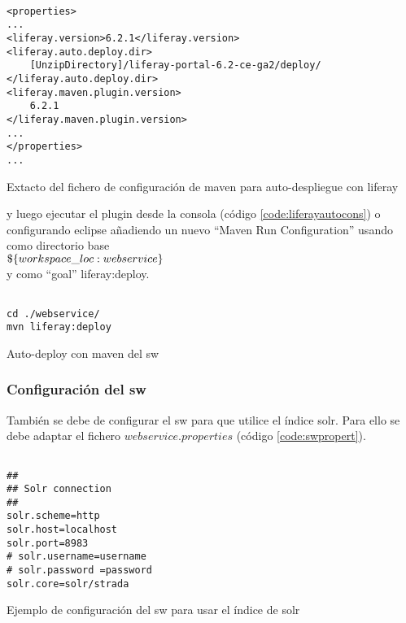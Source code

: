 \begin{listing}[H]
    \begin{verbatim}
               
<properties>
...
<liferay.version>6.2.1</liferay.version>
<liferay.auto.deploy.dir>
	[UnzipDirectory]/liferay-portal-6.2-ce-ga2/deploy/
</liferay.auto.deploy.dir>
<liferay.maven.plugin.version>
	6.2.1
</liferay.maven.plugin.version>
...
</properties>
...
    \end{verbatim}
    \caption{Extacto del fichero de configuración de \gls{maven} para auto-\gls{despliegue} con \gls{liferay}}
    \label{code:pomsw}
\end{listing}


y luego ejecutar el \gls{plugin} desde la consola (código \ref{code:liferayautocons}) o configurando \gls{eclipse} añadiendo un nuevo ``Maven Run Configuration'' usando como directorio base\\
$\$\{workspace\_loc:\/webservice\}$\\
y como ``goal'' liferay:deploy.

\begin{listing}[H]
    \begin{verbatim}
               
cd ./webservice/
mvn liferay:deploy
    \end{verbatim}
    \caption{Auto-\gls{deploy} con \gls{maven} del \gls{sw}}
    \label{code:liferayautocons}
\end{listing}


\subsubsection{Configuración del \gls{sw}}

También se debe de configurar el \gls{sw} para que utilice el índice \gls{solr}. Para ello se debe adaptar el fichero $webservice.properties$ (código \ref{code:swpropert}).

\begin{listing}[H]
    \begin{verbatim}
               
##
## Solr connection
##
solr.scheme=http
solr.host=localhost
solr.port=8983
# solr.username=username
# solr.password =password
solr.core=solr/strada
    \end{verbatim}
    \caption{Ejemplo de configuración del \gls{sw} para usar el índice de \gls{solr}}
    \label{code:swpropert}
\end{listing}

